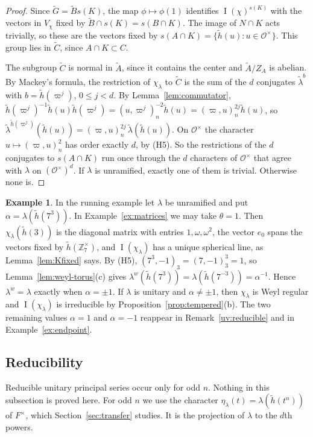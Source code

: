 \documentclass[12pt,letterpaper]{article}
\numberwithin{equation}{section}
\theoremstyle{plain}
\theoremstyle{definition}
\newtheorem{example}[theorem]{Example}
\theoremstyle{remark}
\newcommand{\Gt}{\widetilde G}
\newcommand{\At}{\widetilde A}
\newcommand{\Bt}{\widetilde B}
\newcommand{\Ct}{\widetilde C}
\newcommand{\hl}{\tilde h}
\newcommand{\Zz}{\mathbb Z}
\newcommand{\Of}{\mathcal O}
\newcommand{\ZA}{Z_A}
\DeclareMathOperator{\PI}{I}
\begin{document}
\begin{proof}
Since $\Gt=\Bt s(K)$, the map $\phi\mapsto\phi(1)$ identifies
$\PI(\chi)^{s(K)}$ with the vectors in $V_\chi$ fixed by
$\Bt\cap s(K)=s(B\cap K)$. The image of $N\cap K$ acts trivially, so
these are the vectors fixed by $s(A\cap K)=\{\hl(u):u\in\Of^\times\}$.
This group lies in $\Ct$, since $A\cap K\subset C$.

The subgroup $\Ct$ is normal in $\At$, since it contains the center
and $\At/\ZA$ is abelian. By Mackey's formula, the restriction of
$\chi_\lambda$ to $\Ct$ is the sum of the $d$ conjugates
$\tilde\lambda^{b}$ with $b=\hl(\varpi^j)$, $0\le j<d$. By
Lemma~\ref{lem:commutator},
$\hl(\varpi^j)^{-1}\hl(u)\hl(\varpi^j)=(u,\varpi^j)_n^{-2}\hl(u)
=(\varpi,u)_n^{2j}\hl(u)$, so
$\tilde\lambda^{\hl(\varpi^j)}(\hl(u))=(\varpi,u)_n^{2j}\,
\tilde\lambda(\hl(u))$. On
$\Of^\times$ the character $u\mapsto(\varpi,u)_n^2$ has order exactly
$d$, by (H5). So the restrictions of the $d$ conjugates to
$s(A\cap K)$ run once through the $d$ characters of $\Of^\times$ that
agree with $\lambda$ on $(\Of^\times)^d$. If $\lambda$ is unramified,
exactly one of them is trivial. Otherwise none is.
\end{proof}

\begin{example}\label{ex:Kfixed-three}
In the running example let $\lambda$ be unramified and put
$\alpha=\lambda(\hl(7^3))$. In Example~\ref{ex:matrices} we may take
$\theta=1$. Then $\chi_\lambda(\hl(3))$ is the diagonal matrix with
entries $1,\omega,\omega^2$, the vector $e_0$ spans the vectors fixed
by $\hl(\Zz_7^\times)$, and $\PI(\chi_\lambda)$ has a unique spherical
line, as Lemma~\ref{lem:Kfixed} says. By (H5),
$(7^3,-1)_3=(7,-1)_3^3=1$, so Lemma~\ref{lem:weyl-torus}(c) gives
$\lambda^w(\hl(7^3))=\lambda(\hl(7^{-3}))=\alpha^{-1}$. Hence
$\lambda^w=\lambda$ exactly when $\alpha=\pm1$. If $\lambda$ is unitary
and $\alpha\ne\pm1$, then $\chi_\lambda$ is Weyl regular and
$\PI(\chi_\lambda)$ is irreducible by
Proposition~\ref{prop:tempered}(b). The two remaining values
$\alpha=1$ and $\alpha=-1$ reappear in Remark~\ref{uv:reducible} and in
Example~\ref{ex:endpoint}.
\end{example}

\subsection*{Reducibility}

Reducible unitary principal series occur only for odd $n$. Nothing in
this subsection is proved here. For odd $n$ we use the character
$\eta_\lambda(t)=\lambda(\hl(t^n))$ of $F^\times$, which
Section~\ref{sec:transfer} studies. It is the projection of $\lambda$
to the $d$th powers.
\end{document}

